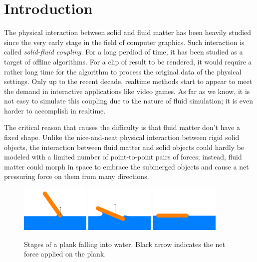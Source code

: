 \section{Introduction}

The physical interaction between solid and fluid matter has been heavily studied since the very early stage in the field of computer graphics.
Such interaction is called \emph{solid-fluid coupling}.
For a long perdiod of time, it has been studied as a target of offline algorithms.
For a clip of result to be rendered, it would require a rather long time for the algorithm to process the original data of the physical settings.
Only up to the recent decade, realtime methods start to appear to meet the demand in interactive applications like video games\citationNeeded.
As far as we know, it is not easy to simulate this coupling due to the nature of fluid simulation;
it is even harder to accomplish in realtime.

The critical reason that causes the difficulty is that fluid matter don't have a fixed shape.
Unlike the nice-and-neat physical interaction between rigid solid objects, the interaction between fluid matter and solid objects could hardly be modeled with a limited number of point-to-point pairs of forces;
instead, fluid matter could morph in space to embrace the submerged objects and cause a net pressuring force on them from many directions.

\begin{figure}[h]
	\begin{center}
		\includegraphics[width=1.3in]{figures/stages-of-a-plank-falling-into-water/1.png}
		\includegraphics[width=1.3in]{figures/stages-of-a-plank-falling-into-water/2.png}
		\includegraphics[width=1.3in]{figures/stages-of-a-plank-falling-into-water/3.png}
	\end{center}
	\caption{
		Stages of a plank falling into water.
		Black arrow indicates the net force applied on the plank.
	}
	\label{stages-of-a-plank-falling-into-water}
\end{figure}

